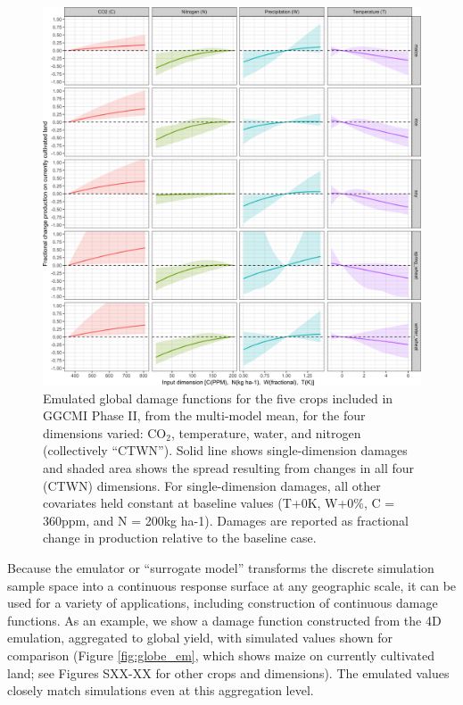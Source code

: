 \documentclass[gmd, manuscript]{copernicus} %
\begin{document}
\begin{figure}[ht]
  \centering
  \includegraphics[width=15cm]{figures/em_CTWN_all_crops.png}
  \caption{Emulated global damage functions for the five crops included in GGCMI Phase II, from the multi-model mean, for the four dimensions varied: CO$_2$, temperature, water, and nitrogen (collectively ``CTWN''). 
  Solid line shows single-dimension damages and shaded area shows the spread resulting from changes in all four (CTWN) dimensions.
  For single-dimension damages, all other covariates held constant at baseline values (T+0K, W+0\%, C = 360ppm, and N = 200kg ha-1). Damages are reported as fractional change in production relative to the baseline case.}
  \label{fig:all_dims}
\end{figure}

Because the emulator or ``surrogate model'' transforms the discrete simulation sample space into a continuous response surface at any geographic scale, it can be used for a variety of applications, including construction of continuous damage functions. 
As an example, we show a damage function constructed from the 4D emulation, aggregated to global yield, with simulated values shown for comparison (Figure \ref{fig:globe_em}, which shows maize on currently cultivated land; see Figures SXX-XX for other crops and dimensions). 
The emulated values closely match simulations even at this aggregation level.
\end{document}

